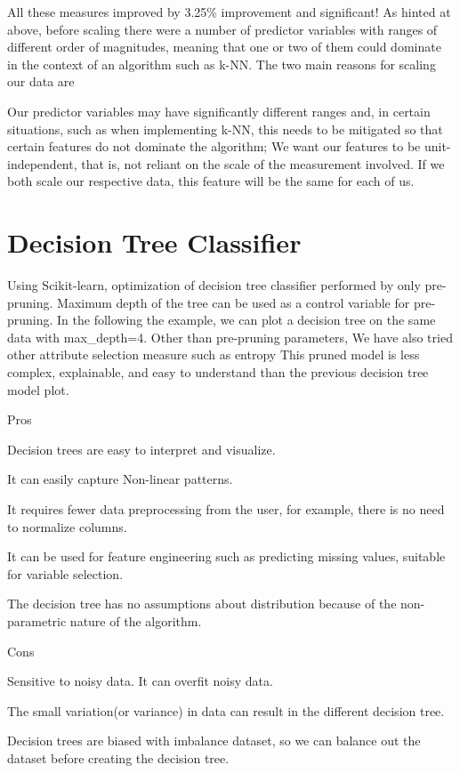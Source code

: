 \documentclass[11pt]{article}
\begin{document}
    All these measures improved by 3.25\% improvement and significant! As
hinted at above, before scaling there were a number of predictor
variables with ranges of different order of magnitudes, meaning that one
or two of them could dominate in the context of an algorithm such as
k-NN. The two main reasons for scaling our data are

Our predictor variables may have significantly different ranges and, in
certain situations, such as when implementing k-NN, this needs to be
mitigated so that certain features do not dominate the algorithm; We
want our features to be unit-independent, that is, not reliant on the
scale of the measurement involved. If we both scale our respective data,
this feature will be the same for each of us.

    \section{Decision Tree Classifier}\label{decision-tree-classifier}

Using Scikit-learn, optimization of decision tree classifier performed
by only pre-pruning. Maximum depth of the tree can be used as a control
variable for pre-pruning. In the following the example, we can plot a
decision tree on the same data with max\_depth=4. Other than pre-pruning
parameters, We have also tried other attribute selection measure such as
entropy This pruned model is less complex, explainable, and easy to
understand than the previous decision tree model plot.

Pros

Decision trees are easy to interpret and visualize.

It can easily capture Non-linear patterns.

It requires fewer data preprocessing from the user, for example, there
is no need to normalize columns.

It can be used for feature engineering such as predicting missing
values, suitable for variable selection.

The decision tree has no assumptions about distribution because of the
non-parametric nature of the algorithm.

Cons

Sensitive to noisy data. It can overfit noisy data.

The small variation(or variance) in data can result in the different
decision tree.

Decision trees are biased with imbalance dataset, so we can balance out
the dataset before creating the decision tree.
\end{document}
